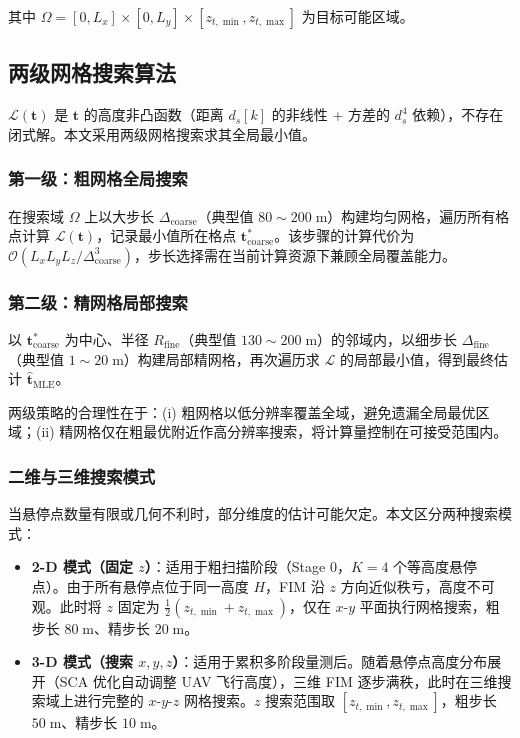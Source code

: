 其中 $\Omega=[0,L_x]\times[0,L_y]\times[z_{t,\min},z_{t,\max}]$ 为目标可能区域。

\subsection{两级网格搜索算法}

$\mathcal{L}(\mathbf{t})$ 是 $\mathbf{t}$ 的高度非凸函数（距离 $d_s[k]$ 的非线性 + 方差的 $d_s^4$ 依赖），不存在闭式解。本文采用两级网格搜索求其全局最小值。

\subsubsection{第一级：粗网格全局搜索}

在搜索域 $\Omega$ 上以大步长 $\Delta_{\mathrm{coarse}}$（典型值 $80\sim200\;\mathrm{m}$）构建均匀网格，遍历所有格点计算 $\mathcal{L}(\mathbf{t})$，记录最小值所在格点 $\mathbf{t}_{\mathrm{coarse}}^*$。该步骤的计算代价为 $\mathcal{O}(L_xL_yL_z/\Delta_{\mathrm{coarse}}^3)$，步长选择需在当前计算资源下兼顾全局覆盖能力。

\subsubsection{第二级：精网格局部搜索}

以 $\mathbf{t}_{\mathrm{coarse}}^*$ 为中心、半径 $R_{\mathrm{fine}}$（典型值 $130\sim200\;\mathrm{m}$）的邻域内，以细步长 $\Delta_{\mathrm{fine}}$（典型值 $1\sim20\;\mathrm{m}$）构建局部精网格，再次遍历求 $\mathcal{L}$ 的局部最小值，得到最终估计 $\hat{\mathbf{t}}_{\mathrm{MLE}}$。

两级策略的合理性在于：(i) 粗网格以低分辨率覆盖全域，避免遗漏全局最优区域；(ii) 精网格仅在粗最优附近作高分辨率搜索，将计算量控制在可接受范围内。

\subsubsection{二维与三维搜索模式}

当悬停点数量有限或几何不利时，部分维度的估计可能欠定。本文区分两种搜索模式：

\begin{itemize}
    \item \textbf{2-D 模式（固定 $z$）}：适用于粗扫描阶段（Stage 0，$K=4$ 个等高度悬停点）。由于所有悬停点位于同一高度 $H$，FIM 沿 $z$ 方向近似秩亏，高度不可观。此时将 $z$ 固定为 $\frac{1}{2}(z_{t,\min}+z_{t,\max})$，仅在 $x$-$y$ 平面执行网格搜索，粗步长 $80\;\mathrm{m}$、精步长 $20\;\mathrm{m}$。
    \item \textbf{3-D 模式（搜索 $x,y,z$）}：适用于累积多阶段量测后。随着悬停点高度分布展开（SCA 优化自动调整 UAV 飞行高度），三维 FIM 逐步满秩，此时在三维搜索域上进行完整的 $x$-$y$-$z$ 网格搜索。$z$ 搜索范围取 $[z_{t,\min},z_{t,\max}]$，粗步长 $50\;\mathrm{m}$、精步长 $10\;\mathrm{m}$。
\end{itemize}

